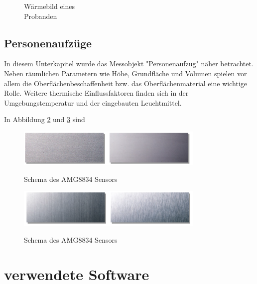 \begin{figure}[H]
\begin{minipage}[b]{0.4\textwidth}
\caption[Wäermebild eines \\Probanden]{Wärmebild eines \\Probanden}
\label{fig:Waermebild2}
	\end{minipage}
	
\end{figure}


\subsection{Personenaufzüge}

In diesem Unterkapitel wurde das Messobjekt "Personenaufzug" näher betrachtet. Neben räumlichen Parametern wie Höhe, Grundfläche und Volumen spielen vor allem die Oberflächenbeschaffenheit bzw. das Oberflächenmaterial eine wichtige Rolle. Weitere thermische Einflussfaktoren finden sich in der Umgebungstemperatur und der eingebauten Leuchtmittel.


In Abbildung \ref{fig:Edelstahlgewalzt} und \ref{fig:Edelstahlmatt} sind 
\begin{figure}[H]
	\centering
	\includegraphics[width=0.8\textwidth]
	{fig/Edelstahl_gewalzt.PNG}
	\caption[Schema des AMG8834 Sensors]{Schema des AMG8834 Sensors} \protect\cite{Edelstahl}
	\label{fig:Edelstahlgewalzt}
\end{figure}
\begin{figure}[H]
	\centering
	\includegraphics[width=0.8\textwidth]
	{fig/Edelstahl_matt.PNG}
	\caption[Schema des AMG8834 Sensors]{Schema des AMG8834 Sensors} \protect\cite{Edelstahl}
	\label{fig:Edelstahlmatt}	
\end{figure}











\section{verwendete Software}



